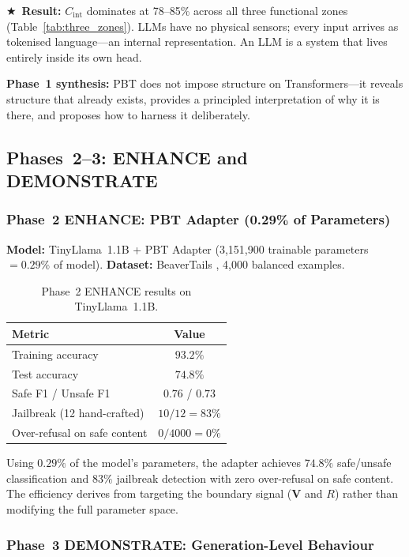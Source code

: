 \documentclass[12pt,a4paper]{article}
\newcommand{\Cint}{C_{\mathrm{int}}}
\newcommand{\starred}{\textbf{\textcolor{pbtblue}{$\bigstar$}}~}
\begin{document}
\starred\textbf{Result:} $\Cint$ dominates at 78--85\% across all three
functional zones (Table~\ref{tab:three_zones}). LLMs have no physical sensors;
every input arrives as tokenised language---an internal representation. An LLM
is a system that lives entirely inside its own head.

\textbf{Phase~1 synthesis:} PBT does not impose structure on Transformers---it
reveals structure that already exists, provides a principled interpretation of
why it is there, and proposes how to harness it deliberately.

\subsection{Phases~2--3: ENHANCE and DEMONSTRATE}

\subsubsection{Phase~2 ENHANCE: PBT Adapter (0.29\% of Parameters)}

\textbf{Model:} TinyLlama~1.1B + PBT Adapter
(3,151,900 trainable parameters $= 0.29\%$ of model).
\textbf{Dataset:} BeaverTails \citep{ji2023}, 4,000 balanced examples.

\begin{table}[ht]
\centering
\caption{Phase~2 ENHANCE results on TinyLlama~1.1B.}
\label{tab:phase2}
\small
\begin{tabular}{@{}lc@{}}
\toprule
\textbf{Metric} & \textbf{Value} \\
\midrule
Training accuracy         & $93.2\%$ \\
Test accuracy             & $74.8\%$ \\
Safe F1 / Unsafe F1       & $0.76$ / $0.73$ \\
Jailbreak (12 hand-crafted) & $10/12 = 83\%$ \\
Over-refusal on safe content & $0/4000 = 0\%$ \\
\bottomrule
\end{tabular}
\end{table}

Using $0.29\%$ of the model's parameters, the adapter achieves $74.8\%$
safe/unsafe classification and $83\%$ jailbreak detection with zero
over-refusal on safe content. The efficiency derives from targeting the
boundary signal ($\mathbf{V}$ and $R$) rather than modifying the full parameter
space.

\subsubsection{Phase~3 DEMONSTRATE: Generation-Level Behaviour}
\end{document}

